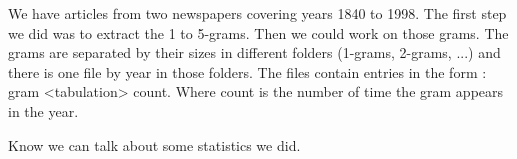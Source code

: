 We have articles from two newspapers covering years 1840 to 1998. The first step we did was to extract the 1 to 5-grams. Then we could work on those grams. The grams are separated by their sizes in different folders (1-grams, 2-grams, ...) and there is one file by year in those folders. The files contain entries in the form : gram <tabulation> count. Where count is the number of time the gram appears in the year.

Know we can talk about some statistics we did.